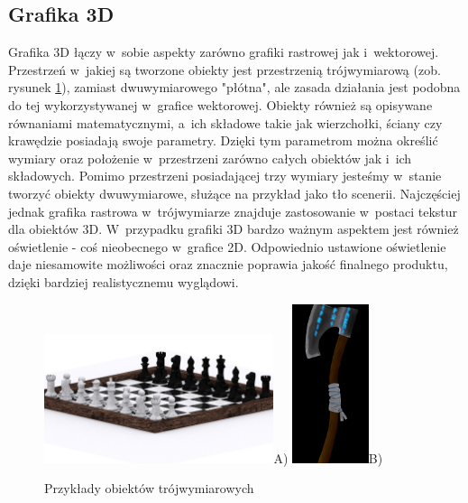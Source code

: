 \documentclass[12pt,a4paper,oneside]{book}
\theoremstyle{definition}
\numberwithin{equation}{chapter}
\begin{document}
\subsection{Grafika 3D}

\par Grafika 3D łączy w~sobie aspekty zarówno grafiki rastrowej jak i~wektorowej. Przestrzeń w~jakiej są tworzone obiekty jest przestrzenią trójwymiarową (zob. rysunek \ref{3DGraphics_2}), zamiast dwuwymiarowego "płótna", ale zasada działania jest podobna do tej wykorzystywanej w~grafice wektorowej. Obiekty również są opisywane równaniami matematycznymi, a~ich składowe takie jak wierzchołki, ściany czy krawędzie posiadają swoje parametry. Dzięki tym parametrom można określić wymiary oraz położenie w~przestrzeni zarówno całych obiektów jak i~ich składowych. Pomimo przestrzeni posiadającej trzy wymiary jesteśmy w~stanie tworzyć obiekty dwuwymiarowe, służące na przykład jako tło scenerii. Najczęściej jednak grafika rastrowa w~trójwymiarze znajduje zastosowanie w~postaci tekstur dla obiektów 3D. W~przypadku grafiki 3D bardzo ważnym aspektem jest również oświetlenie - coś nieobecnego w~grafice 2D. Odpowiednio ustawione oświetlenie daje niesamowite możliwości oraz znacznie poprawia jakość finalnego produktu, dzięki bardziej realistycznemu wyglądowi.

\begin{figure}[hpt!]
        \centering
        \quad\includegraphics[width=0.6\textwidth]{images/Chess_1.jpg}A)
        \quad\includegraphics[width=0.2\textwidth]{images/3D_Axe.jpg}B)
        \caption{Przykłady obiektów trójwymiarowych}
        \label{3DGraphics_2}
\end{figure}
\end{document}
